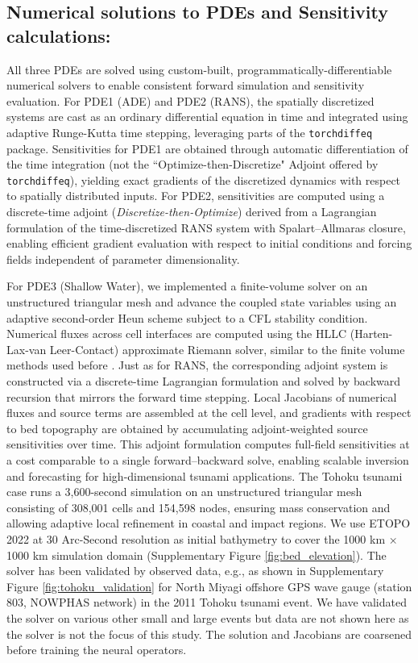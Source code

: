 \subsection{Numerical solutions to PDEs and Sensitivity calculations:}
All three PDEs are solved using custom-built, programmatically-differentiable numerical solvers to enable consistent forward simulation and sensitivity evaluation. For PDE1 (ADE) and PDE2 (RANS), the spatially discretized systems are cast as an ordinary differential equation in time and integrated using adaptive Runge-Kutta time stepping, leveraging parts of the \texttt{torchdiffeq} package. Sensitivities for PDE1 are obtained through automatic differentiation of the time integration (not the ``Optimize-then-Discretize" Adjoint offered by \texttt{torchdiffeq}), yielding exact gradients of the discretized dynamics with respect to spatially distributed inputs. For PDE2, sensitivities are computed using a discrete-time adjoint (\textit{Discretize-then-Optimize}) derived from a Lagrangian formulation of the time-discretized RANS system with Spalart–Allmaras closure, enabling efficient gradient evaluation with respect to initial conditions and forcing fields independent of parameter dimensionality.

For PDE3 (Shallow Water), we implemented a finite-volume solver on an unstructured triangular mesh and advance the coupled state variables using an adaptive second-order Heun scheme subject to a CFL stability condition. Numerical fluxes across cell interfaces are computed using the HLLC (Harten-Lax-van Leer-Contact) approximate Riemann solver, similar to the finite volume methods used before \citep{vogl2017high}. Just as for RANS, the corresponding adjoint system is constructed via a discrete-time Lagrangian formulation and solved by backward recursion that mirrors the forward time stepping. Local Jacobians of numerical fluxes and source terms are assembled at the cell level, and gradients with respect to bed topography are obtained by accumulating adjoint-weighted source sensitivities over time. This adjoint formulation computes full-field sensitivities at a cost comparable to a single forward–backward solve, enabling scalable inversion and forecasting for high-dimensional tsunami applications. The Tohoku tsunami case runs a 3,600-second simulation on an unstructured triangular mesh consisting of 308,001 cells and 154,598 nodes, ensuring mass conservation and allowing adaptive local refinement in coastal and impact regions. We use ETOPO 2022 at 30 Arc-Second resolution as initial bathymetry to cover the 1000 km × 1000 km simulation domain (Supplementary Figure \ref{fig:bed_elevation}). The solver has been validated by observed data, e.g., as shown in Supplementary Figure \ref{fig:tohoku_validation} for North Miyagi offshore GPS wave gauge (station 803, NOWPHAS network) in the 2011 Tohoku tsunami event. We have validated the solver on various other small and large events but data are not shown here as the solver is not the focus of this study. The solution and Jacobians are coarsened before training the neural operators.

